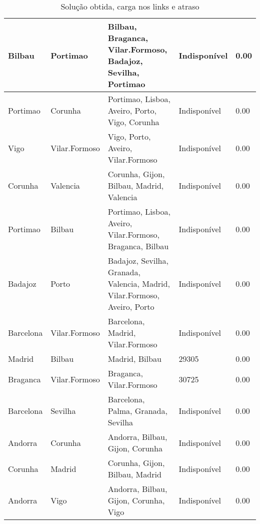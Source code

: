 \begin{table}[!htb]
{\begin{tabular}{|l|l|l|l|l|}
Bilbau & Portimao & Bilbau, Braganca, Vilar.Formoso, Badajoz, Sevilha, Portimao & Indisponível & 0.00 \\ \hline
Portimao & Corunha & Portimao, Lisboa, Aveiro, Porto, Vigo, Corunha & Indisponível & 0.00 \\ \hline
Vigo & Vilar.Formoso & Vigo, Porto, Aveiro, Vilar.Formoso & Indisponível & 0.00 \\ \hline
Corunha & Valencia & Corunha, Gijon, Bilbau, Madrid, Valencia & Indisponível & 0.00 \\ \hline
Portimao & Bilbau & Portimao, Lisboa, Aveiro, Vilar.Formoso, Braganca, Bilbau & Indisponível & 0.00 \\ \hline
Badajoz & Porto & Badajoz, Sevilha, Granada, Valencia, Madrid, Vilar.Formoso, Aveiro, Porto & Indisponível & 0.00 \\ \hline
Barcelona & Vilar.Formoso & Barcelona, Madrid, Vilar.Formoso & Indisponível & 0.00 \\ \hline
Madrid & Bilbau & Madrid, Bilbau & 29305 & 0.00 \\ \hline
Braganca & Vilar.Formoso & Braganca, Vilar.Formoso & 30725 & 0.00 \\ \hline
Barcelona & Sevilha & Barcelona, Palma, Granada, Sevilha & Indisponível & 0.00 \\ \hline
Andorra & Corunha & Andorra, Bilbau, Gijon, Corunha & Indisponível & 0.00 \\ \hline
Corunha & Madrid & Corunha, Gijon, Bilbau, Madrid & Indisponível & 0.00 \\ \hline
Andorra & Vigo & Andorra, Bilbau, Gijon, Corunha, Vigo & Indisponível & 0.00 \\ \hline
\end{tabular}}
\caption[]{Solução obtida, carga nos links e atraso}
\end{table}

